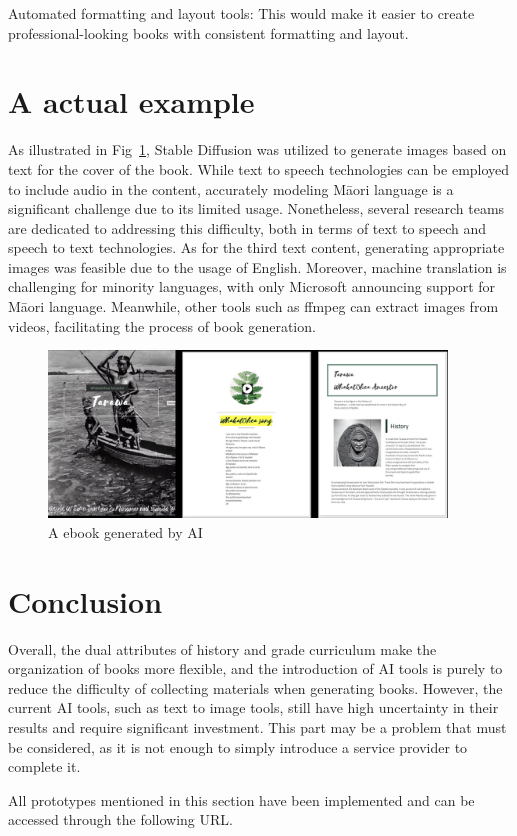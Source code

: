 Automated formatting and layout tools: This would make it easier to create professional-looking books with consistent formatting and layout.

\section{A actual example}

As illustrated in Fig~\ref{s-3}, Stable Diffusion\cite{StableDi96:online} was utilized to generate images based on text for the cover of the book. 
While text to speech technologies can be employed to include audio in the content, accurately modeling Māori language is a significant challenge due to its limited usage. 
Nonetheless, several research teams\cite{PapaReo84:online} \cite{KaituhiA38:online} are dedicated to addressing this difficulty, both in terms of text to speech and speech to text technologies. 
As for the third text content, generating appropriate images was feasible due to the usage of English. 
Moreover, machine translation is challenging for minority languages, with only Microsoft announcing support for Māori language\cite{Kiaorate17:online}. 
Meanwhile, other tools such as ffmpeg can extract images from videos, facilitating the process of book generation.

\begin{figure}[htbp]
  \centerline{\includegraphics[width=300pt]{images/s-3.jpg}}
  \caption{A ebook generated by AI}
  \label{s-3}
\end{figure}

\section{Conclusion}
Overall, the dual attributes of history and grade curriculum make the organization of books more flexible, and the introduction of AI tools is purely to reduce the difficulty of collecting materials when generating books. 
However, the current AI tools, such as text to image tools, still have high uncertainty in their results and require significant investment. 
This part may be a problem that must be considered, as it is not enough to simply introduce a service provider to complete it.

All prototypes mentioned in this section have been implemented and can be accessed through the following URL\cite{Page1wh37:online}.